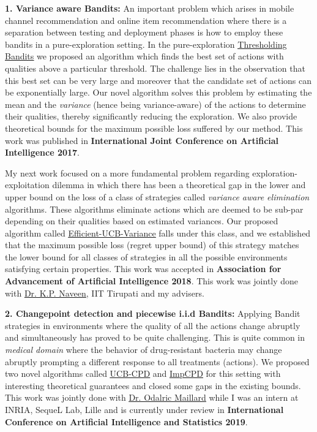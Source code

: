 \documentclass{article}
\begin{document}
\textbf{1. Variance aware Bandits:} An important problem which arises in mobile channel recommendation and online item recommendation where there is a separation between testing and deployment phases is how to employ these bandits in a pure-exploration setting. In the pure-exploration \href{https://www.ijcai.org/proceedings/2017/0350.pdf}{\underline{\color{blue}Thresholding Bandits}} \citep{mukherjee2016} we proposed an algorithm which finds the best set of actions with qualities above a particular threshold. The challenge lies in the observation that this best set can be very large and moreover that the candidate set of actions can be exponentially large. Our novel algorithm solves this problem by estimating the mean and the \textit{variance} (hence being variance-aware) of the actions to determine their qualities, thereby significantly reducing the exploration. We also provide theoretical bounds for the maximum possible loss suffered by our
method. This work was published in \textbf{International Joint Conference on Artificial Intelligence 2017}.


My next work focused on a more fundamental problem regarding exploration-exploitation dilemma in which there has been a theoretical gap in the lower and upper bound on the loss of a class of strategies called \textit{variance aware elimination} algorithms. These algorithms eliminate actions which are deemed to be sub-par depending on their qualities based on estimated variances. Our proposed algorithm called \href{https://www.aaai.org/ocs/index.php/AAAI/AAAI18/paper/view/16111}{\underline{\color{blue}Efficient-UCB-Variance}} \citep{mukherjee2018} falls under this class, and we established that the maximum possible loss (regret upper bound) of this strategy matches the lower bound for all classes of strategies in all the possible environments satisfying certain properties. This work was accepted in \textbf{Association for Advancement of Artificial Intelligence 2018}. This work was jointly done with \underline{\color{red}\href{http://iittp.ac.in/dr-k-p-naveen}{Dr. K.P. Naveen}}, IIT Tirupati and my advisers.

\textbf{2. Changepoint detection and piecewise i.i.d Bandits:}  Applying Bandit strategies in environments where the quality of all the actions change abruptly and simultaneously has proved to be quite challenging. This is quite common in \textit{medical domain} where the behavior of drug-resistant bacteria may change abruptly prompting a different response to all treatments (actions). We proposed two novel algorithms called \href{https://subhojyoti.github.io/pdf/aistats_2019.pdf}{\underline{\color{blue}UCB-CPD}} and \href{https://subhojyoti.github.io/pdf/aistats_2019.pdf}{\underline{\color{blue}ImpCPD}} for this setting with interesting theoretical guarantees and closed some gaps in the existing bounds. This work was jointly done with \href{https://scholar.google.com/citations?user=7EweMdoAAAAJ&hl=en}{\underline{\color{red}Dr. Odalric Maillard}} while I was an intern at INRIA, SequeL Lab, Lille and is currently under review in \textbf{International Conference on Artificial Intelligence and Statistics 2019}. 
\end{document}
